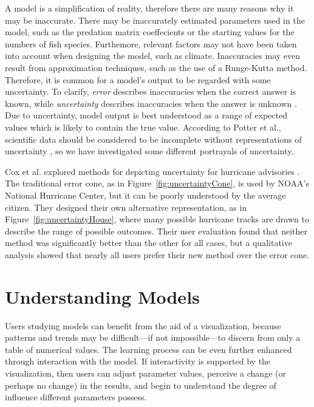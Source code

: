 A model is a simplification of reality, therefore there are many reasons why it may be inaccurate.  There may be inaccurately estimated parameters used in the model, such as the predation matrix coeffecients or the starting values for the numbers of fish species.  Furthemore, relevant factors may not have been taken into account when designing the model, such as climate.  Inaccuracies may even result from approximation techniques, such as the use of a Runge-Kutta method.  Therefore, it is common for a model's output to be regarded with some uncertainty.  To clarify, \textit{error} describes inaccuracies when the correct answer is known, while \textit{uncertainty} describes inaccuracies when the answer is unknown \cite{hunter1993}.  Due to uncertainty, model output is best understood as a range of expected values which is likely to contain the true value.  According to Potter et al., scientific data should be considered to be incomplete without representations of uncertainty \cite{potter2010}, so we have investigated some different portrayals of uncertainty.

Cox et al. explored methods for depicting uncertainty for hurricane advisories \citeyearpar{cox2013}.  The traditional error cone, as in Figure~\ref{fig:uncertaintyCone}, is used by NOAA's National Hurricane Center, but it can be poorly understood by the average citizen.  They designed their own alternative representation, as in Figure~\ref{fig:uncertaintyHouse}, where many possible hurricane tracks are drawn to describe the range of possible outcomes.  Their user evaluation found that neither method was significantly better than the other for all cases, but a qualitative analysis showed that nearly all users prefer their new method over the error cone.

\section{Understanding Models}

Users studying models can benefit from the aid of a visualization, because patterns and trends may be difficult---if not impossible---to discern from only a table of numerical values.  The learning process can be even further enhanced through interaction with the model.  If interactivity is supported by the visualization, then users can adjust parameter values, perceive a change (or perhaps no change) in the results, and begin to understand the degree of influence different parameters possess.

